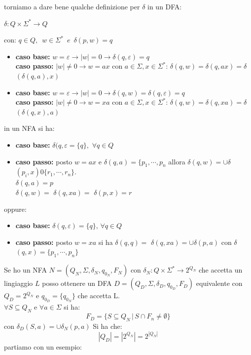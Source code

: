 torniamo a dare bene qualche definizione per {$\delta$} in un DFA:
\begin{center}
	$\delta:Q\times \Sigma^* \to Q$
\end{center}
con: $q\in Q,\,\,\, w\in \Sigma^*\,\,\,e\,\,\,${$\delta$}$(p,w)=q$
\begin{itemize}
	\item
	      \textbf{caso base:} $w=\varepsilon\to |w|=0\to${$\delta$}$(q,\varepsilon)=q$
	      \\
	      \textbf{caso passo:} $|w|\neq0\to w=ax$ con $a\in \Sigma,x\in \Sigma^*$:
	      {$\delta$}$(q,w)=${$\delta$}$(q,ax)=${$\delta$} $(\delta(q,a),x)$
	\item
	      \textbf{caso base:} $w=\varepsilon\to |w|=0\to \delta(q,w)=\delta(q,\varepsilon)=q$
	      \\
	      \textbf{caso passo:} $|w|\neq0\to w=xa$ con $a\in \Sigma,x\in \Sigma^*$:
	      {$\delta$}$(q,w)=${$\delta$}$(q,xa)=${$\delta$} $(\delta(q,x),a)$
\end{itemize}
in un NFA si ha:
\begin{itemize}
	\item \textbf{caso base:}  {$\delta$}$(q,\varepsilon=\{q\},\,\,\forall q\in Q$
	\item \textbf{caso passo:} posto $w=ax$ e {$\delta$}$(q,a)=\{p_1,\cdots,p_n$ allora {$\delta$}$(q,w)=\cup${$\delta$}$(p_i, x)0\{r_1,\cdots,r_n\}$.\\
	      {$\delta$}$(q,a)=p$\\
	      {$\delta$}$(q,w)=$ {$\delta$}$(q,xa)=$ {$\delta$}$(p,x)=r$
\end{itemize}
oppure:
\begin{itemize}
	\item \textbf{caso base:}  {$\delta$}$(q,\varepsilon)=\{q\},\,\forall q\in Q$
	\item \textbf{caso passo:} posto $w=xa$ si ha  {$\delta$}$(q,q)=$ {$\delta$}$(q,xa)=\cup \delta(p,a)$ con  {$\delta$}$(q,x)=\{p_1,\cdots,p_n\}$
\end{itemize}
Se ho un NFA $N=(Q_N, \Sigma, \delta_N, q_{0_N}, F_N)$ con $\delta_N: Q\times\Sigma^*\to 2^{Q_N}$ che accetta un lingiaggio $L$ posso ottenere un DFA $D=(Q_D, \Sigma, \delta_D, q_{0_D}, F_D)$ equivalente con $Q_D=2^{Q_N}$  e $q_{0_D}=\{q_{0_N}\}$ che accetta L.\\
$\forall S\subseteq Q_N$ e $\forall a\in \Sigma$ si ha:
$$F_D=\{S\subseteq Q_N\,|\, S\cap F_n\neq \emptyset\}$$
con $\delta_D(S,a)=\cup \delta_N(p,a)$
Si ha che:
$$|Q_D|=|2^{Q_N}|=2^{|Q_N|}$$
partiamo con un esempio:
